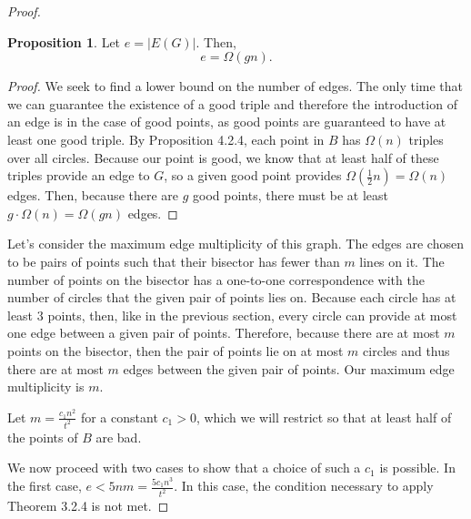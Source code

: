 \documentclass{scrippsthesisclass}
\theoremstyle{definition}
\newtheorem{proposition}[theorem]{Proposition}
\begin{document}
\begin{proof}
\begin{proposition}
    Let $e = |E(G)|$. 
    Then, 
    \[e = \Omega(gn).\]
\end{proposition}
\begin{proof}
    We seek to find a lower bound on the number of edges. 
    The only time that we can guarantee the existence of a good triple and therefore the introduction of an edge is in the case of good points, as good points are guaranteed to have at least one good triple. 
    By Proposition 4.2.4, each point in $B$ has $\Omega(n)$ triples over all circles. 
    Because our point is good, we know that at least half of these triples provide an edge to $G$, so a given good point provides $\Omega \left(\frac{1}{2} n \right) = \Omega(n)$ edges. 
    Then, because there are $g$ good points, there must be at least $g \cdot \Omega(n) = \Omega(gn)$ edges.
\end{proof}

Let's consider the maximum edge multiplicity of this graph. 
The edges are chosen to be pairs of points such that their bisector has fewer than $m$ lines on it.
The number of points on the bisector has a one-to-one correspondence with the number of circles that the given pair of points lies on.
Because each circle has at least $3$ points, then, like in the previous section, every circle can provide at most one edge between a given pair of points. 
Therefore, because there are at most $m$ points on the bisector, then the pair of points lie on at most $m$ circles and thus there are at most $m$ edges between the given pair of points. 
Our maximum edge multiplicity is $m$.

Let $m = \frac{c_1n^2}{t^2}$ for a constant $c_1 > 0$, which we will restrict so that at least half of the points of $B$ are bad. 

We now proceed with two cases to show that a choice of such a $c_1$ is possible. 
In the first case, $e < 5nm = \frac{5c_1n^3}{t^2}$. In this case, the condition necessary to apply Theorem 3.2.4 is not met.  


\end{proof}
\end{document}
